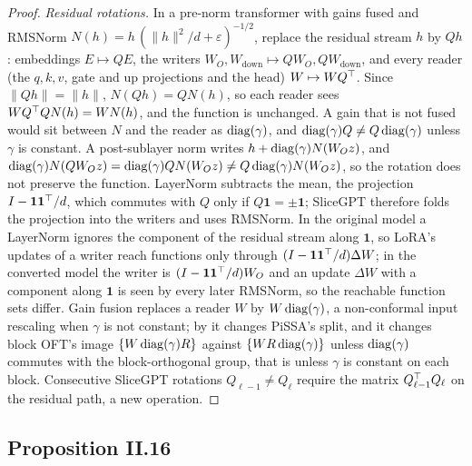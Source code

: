 \begin{proof}
\emph{Residual rotations.} In a pre-norm transformer with gains fused and RMSNorm $N(h)=h\,(\lVert h\rVert^2/d+\varepsilon)^{-1/2}$,
replace the residual stream $h$ by $Qh$: embeddings $E\mapsto QE$, the writers $W_O,W_{\mathrm{down}}\mapsto QW_O,QW_{\mathrm{down}}$,
and every reader (the $q,k,v$, gate and up projections and the head) $W\mapsto WQ^{\top}$. Since $\lVert Qh\rVert=\lVert h\rVert$,
$N(Qh)=QN(h)$, so each reader sees $WQ^{\top} QN(h)=WN(h)$, and the function is unchanged. A gain that is not fused would sit
between $N$ and the reader as $\operatorname{diag}(\gamma)$, and $\operatorname{diag}(\gamma)Q\ne Q\operatorname{diag}(\gamma)$ unless $\gamma$ is constant. A
post-sublayer norm writes $h+\operatorname{diag}(\gamma)N(W_Oz)$, and $\operatorname{diag}(\gamma)N(QW_Oz)=\operatorname{diag}(\gamma)QN(W_Oz)\ne Q\operatorname{diag}(\gamma)N(W_Oz)$,
so the rotation does not preserve the function. LayerNorm subtracts the mean, the projection $I-\mathbf 1\mathbf 1^{\top}/d$, which
commutes with $Q$ only if $Q\mathbf 1=\pm\mathbf 1$; SliceGPT therefore folds the projection into the writers and uses RMSNorm.
In the original model a LayerNorm ignores the component of the residual stream along $\mathbf 1$, so LoRA's updates of a writer
reach functions only through $(I-\mathbf 1\mathbf 1^{\top}/d)\Delta W$; in the converted model the writer is
$(I-\mathbf 1\mathbf 1^{\top}/d)W_O$ and an update $\Delta W$ with a component along $\mathbf 1$ is seen by every later RMSNorm, so the
reachable function sets differ. Gain fusion replaces a reader $W$ by $W\operatorname{diag}(\gamma)$, a non-conformal input rescaling when
$\gamma$ is not constant; by  it changes PiSSA's split, and it changes block OFT's image
$\{W\operatorname{diag}(\gamma)R\}$ against $\{WR\operatorname{diag}(\gamma)\}$ unless $\operatorname{diag}(\gamma)$ commutes with the block-orthogonal group, that is
unless $\gamma$ is constant on each block. Consecutive SliceGPT rotations $Q_{\ell-1}\ne Q_\ell$ require the matrix
$Q_{\ell-1}^{\top} Q_\ell$ on the residual path, a new operation.
\end{proof}

\subsection{Proposition II.16}\label{proof:II.16}

